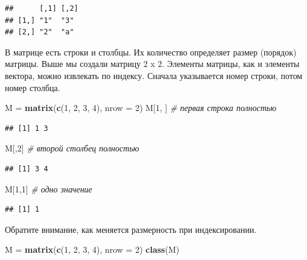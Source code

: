 \documentclass[
]{book}
\newenvironment{Shaded}{\begin{snugshade}}{\end{snugshade}}
\newcommand{\AttributeTok}[1]{\textcolor[rgb]{0.13,0.29,0.53}{#1}}
\newcommand{\CommentTok}[1]{\textcolor[rgb]{0.56,0.35,0.01}{\textit{#1}}}
\newcommand{\DecValTok}[1]{\textcolor[rgb]{0.00,0.00,0.81}{#1}}
\newcommand{\FunctionTok}[1]{\textcolor[rgb]{0.13,0.29,0.53}{\textbf{#1}}}
\newcommand{\NormalTok}[1]{#1}
\newcommand{\OtherTok}[1]{\textcolor[rgb]{0.56,0.35,0.01}{#1}}
\theoremstyle{definition}
\theoremstyle{definition}
\theoremstyle{definition}
\theoremstyle{definition}
\theoremstyle{remark}
\begin{document}
\begin{verbatim}
##      [,1] [,2]
## [1,] "1"  "3" 
## [2,] "2"  "a"
\end{verbatim}

В матрице есть строки и столбцы. Их количество определяет размер (порядок) матрицы. Выше мы создали матрицу 2 x 2. Элементы матрицы, как и элементы вектора, можно извлекать по индексу. Сначала указывается номер строки, потом номер столбца.

\begin{Shaded}
\begin{Highlighting}[]
\NormalTok{M }\OtherTok{=} \FunctionTok{matrix}\NormalTok{(}\FunctionTok{c}\NormalTok{(}\DecValTok{1}\NormalTok{, }\DecValTok{2}\NormalTok{, }\DecValTok{3}\NormalTok{, }\DecValTok{4}\NormalTok{), }\AttributeTok{nrow =} \DecValTok{2}\NormalTok{)}
\NormalTok{M[}\DecValTok{1}\NormalTok{, ] }\CommentTok{\# первая строка полностью}
\end{Highlighting}
\end{Shaded}

\begin{verbatim}
## [1] 1 3
\end{verbatim}

\begin{Shaded}
\begin{Highlighting}[]
\NormalTok{M[,}\DecValTok{2}\NormalTok{] }\CommentTok{\# второй столбец полностью}
\end{Highlighting}
\end{Shaded}

\begin{verbatim}
## [1] 3 4
\end{verbatim}

\begin{Shaded}
\begin{Highlighting}[]
\NormalTok{M[}\DecValTok{1}\NormalTok{,}\DecValTok{1}\NormalTok{] }\CommentTok{\# одно значение}
\end{Highlighting}
\end{Shaded}

\begin{verbatim}
## [1] 1
\end{verbatim}

Обратите внимание, как меняется размерность при индексировании.

\begin{Shaded}
\begin{Highlighting}[]
\NormalTok{M }\OtherTok{=} \FunctionTok{matrix}\NormalTok{(}\FunctionTok{c}\NormalTok{(}\DecValTok{1}\NormalTok{, }\DecValTok{2}\NormalTok{, }\DecValTok{3}\NormalTok{, }\DecValTok{4}\NormalTok{), }\AttributeTok{nrow =} \DecValTok{2}\NormalTok{)}
\FunctionTok{class}\NormalTok{(M)}
\end{Highlighting}
\end{Shaded}
\end{document}
